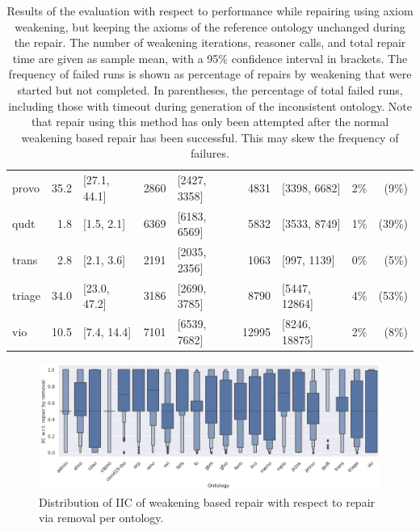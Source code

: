 \begin{table}[htbp]
\begin{tabular}{|l|r@{ }lr@{ }lr@{ }lr@{ }r|}
    provo & 35.2 & [27.1, 44.1] & 2860 & [2427, 3358] & 4831 & [3398, 6682] & 2\% & (9\%) \\
    qudt & 1.8 & [1.5, 2.1] & 6369 & [6183, 6569] & 5832 & [3533, 8749] & 1\% & (39\%) \\
    trans & 2.8 & [2.1, 3.6] & 2191 & [2035, 2356] & 1063 & [997, 1139] & 0\% & (5\%) \\
    triage & 34.0 & [23.0, 47.2] & 3186 & [2690, 3785] & 8790 & [5447, 12864] & 4\% & (53\%) \\
    vio & 10.5 & [7.4, 14.4] & 7101 & [6539, 7682] & 12995 & [8246, 18875] & 2\% & (8\%) \\
    \hline
  \end{tabular}
  \caption{Results of the evaluation with respect to performance while repairing using axiom weakening, but keeping the axioms of the reference ontology unchanged during the repair. The number of weakening iterations, reasoner calls, and total repair time are given as sample mean, with a 95\% confidence interval in brackets. The frequency of failed runs is shown as percentage of repairs by weakening that were started but not completed. In parentheses, the percentage of total failed runs, including those with timeout during generation of the inconsistent ontology. Note that repair using this method has only been attempted after the normal weakening based repair has been successful. This may skew the frequency of failures.}
\end{table}

\iffalse

\begin{figure}[htbp]
  \centering
  \includegraphics[width=\textwidth]{resources/iic-remove-ontology-violin.png}
  \caption{Distribution of IIC of weakening based repair with respect to repair via removal per ontology.}
\end{figure}

